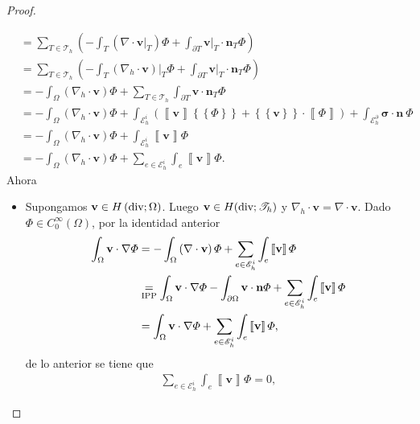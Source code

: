 \documentclass[10pt,a4paper]{report}
\newcommand{\bs}{\boldsymbol}
\newcommand{\Hdiv}{H\left(\textup{div};\Omega\right)}
\newcommand{\Hdivt}{H(\textup{div};\mathscr{T}_{h})}
\providecommand{\salto}[1]{\left\llbracket#1\right\rrbracket}
\providecommand{\prom}[1]{\left \{\!\left \{#1\right \}\!\right \}}
\begin{document}
\begin{proof}
\begin{itemize}
\begin{align*}
            	&=\sum_{T\in\mathscr{T}_{h}}\left(-\int_{T}\left(\nabla\cdot\textbf{v}\vert_{T}\right)\varPhi + \int_{\partial T} \textbf{v}\vert_{T}\cdot \textbf{n}_{T}\varPhi \right)\\
            	&= \sum_{T\in\mathscr{T}_{h}}\left(-\int_{T}\left(\nabla_{h}\cdot \textbf{v}\right)\vert_{T}\varPhi + \int_{\partial T} \textbf{v}\vert_{T}\cdot \textbf{n}_{T}\varPhi \right)\\
            	&= -\int_{\Omega}\left(\nabla_{h}\cdot \textbf{v}\right)\varPhi + \sum_{T\in\mathscr{T}_{h}}\int_{\partial T} \textbf{v}\cdot \textbf{n}_{T}\varPhi\\
            	&= -\int_{\Omega}\left(\nabla_{h}\cdot \textbf{v}\right)\varPhi + \int_{\mathscr{E}^{i}_{h}}\left(\salto{\textbf{v}}\prom{\varPhi}+\prom{\textbf{v}}\cdot \salto{\varPhi}\right) + \int_{\mathscr{E}^{\partial}_{h}}\bs{\sigma}\cdot \textbf{n}\ \varPhi\\
            	&= -\int_{\Omega}\left(\nabla_{h}\cdot \textbf{v}\right)\varPhi + \int_{\mathscr{E}^{i}_{h}}\salto{\textbf{v}}\varPhi\\
            	&= -\int_{\Omega}\left(\nabla_{h}\cdot \textbf{v}\right)\varPhi + \sum_{e\in \mathscr{E}^{i}_{h}}\int_{e}\salto{\textbf{v}}\varPhi.
            \end{align*}
        Ahora
        \begin{itemize}
        	\item[$(\Longrightarrow)$] Supongamos $\textbf{v}\in \Hdiv$. Luego $\textbf{v}\in \Hdivt$ y $\nabla_{h}\cdot \textbf{v} = \nabla\cdot \textbf{v}$. Dado $\varPhi\in C^{\infty}_{0}\left(\Omega\right)$, por la identidad anterior
        	\begin{align*}
        		\int_{\Omega}\textbf{v}\cdot\nabla\varPhi &= -\int_{\Omega}\left(\nabla\cdot \textbf{v}\right)\varPhi + \sum_{e\in \mathscr{E}^{i}_{h}}\int_{e}\salto{\textbf{v}}\varPhi\\
        		&\underset{\textup{IPP}}{=} \int_{\Omega}\textbf{v}\cdot\nabla\varPhi - \int_{\partial\Omega}\textbf{v}\cdot\textbf{n}\varPhi + \sum_{e\in \mathscr{E}^{i}_{h}}\int_{e}\salto{\textbf{v}}\varPhi\\
        		&= \int_{\Omega}\textbf{v}\cdot\nabla\varPhi + \sum_{e\in \mathscr{E}^{i}_{h}}\int_{e}\salto{\textbf{v}}\varPhi,
        	\end{align*}
            de lo anterior se tiene que 
            \begin{align*}
            	 \sum_{e\in \mathscr{E}^{i}_{h}}\int_{e}\salto{\textbf{v}}\varPhi = 0,

\end{align*}
\end{itemize}
\end{itemize}
\end{proof}
\end{document}

